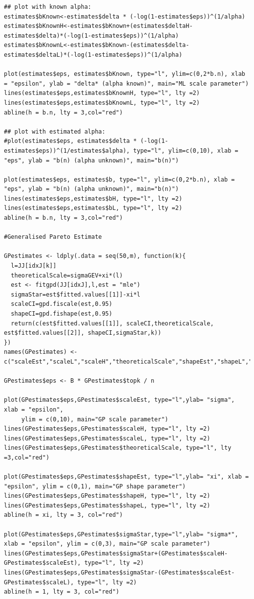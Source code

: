 \documentclass[honours,12pt,twoside, openright]{unswthesis}
\newcommand{\1}{\mathbf 1}
\numberwithin{equation}{section}
\theoremstyle{definition}
\theoremstyle{remark}
\begin{document}
\begin{appendices}
\begin{lstlisting}
## plot with known alpha:
estimates$bKnown<-estimates$delta * (-log(1-estimates$eps))^(1/alpha)
estimates$bKnownH<-estimates$bKnown+(estimates$deltaH-estimates$delta)*(-log(1-estimates$eps))^(1/alpha)
estimates$bKnownL<-estimates$bKnown-(estimates$delta-estimates$deltaL)*(-log(1-estimates$eps))^(1/alpha)

plot(estimates$eps, estimates$bKnown, type="l", ylim=c(0,2*b.n), xlab = "epsilon", ylab = "delta* (alpha known)", main="ML scale parameter")
lines(estimates$eps,estimates$bKnownH, type="l", lty =2)
lines(estimates$eps,estimates$bKnownL, type="l", lty =2)
abline(h = b.n, lty = 3,col="red")

## plot with estimated alpha:
#plot(estimates$eps, estimates$delta * (-log(1-estimates$eps))^(1/estimates$alpha), type="l", ylim=c(0,10), xlab = "eps", ylab = "b(n) (alpha unknown)", main="b(n)")

plot(estimates$eps, estimates$b, type="l", ylim=c(0,2*b.n), xlab = "eps", ylab = "b(n) (alpha unknown)", main="b(n)")
lines(estimates$eps,estimates$bH, type="l", lty =2)
lines(estimates$eps,estimates$bL, type="l", lty =2)
abline(h = b.n, lty = 3,col="red")

#Generalised Pareto Estimate

GPestimates <- ldply(.data = seq(50,m), function(k){
  l=JJ[idxJ[k]]
  theoreticalScale=sigmaGEV+xi*(l)
  est <- fitgpd(JJ[idxJ],l,est = "mle")
  sigmaStar=est$fitted.values[[1]]-xi*l
  scaleCI=gpd.fiscale(est,0.95)
  shapeCI=gpd.fishape(est,0.95)
  return(c(est$fitted.values[[1]], scaleCI,theoreticalScale, est$fitted.values[[2]], shapeCI,sigmaStar,k))
})
names(GPestimates) <- c("scaleEst","scaleL","scaleH","theoreticalScale","shapeEst","shapeL","shapeH","sigmaStar","topk")

GPestimates$eps <- B * GPestimates$topk / n

plot(GPestimates$eps,GPestimates$scaleEst, type="l",ylab= "sigma", xlab = "epsilon", 
     ylim = c(0,10), main="GP scale parameter")
lines(GPestimates$eps,GPestimates$scaleH, type="l", lty =2)
lines(GPestimates$eps,GPestimates$scaleL, type="l", lty =2)
lines(GPestimates$eps,GPestimates$theoreticalScale, type="l", lty =3,col="red")

plot(GPestimates$eps,GPestimates$shapeEst, type="l",ylab= "xi", xlab = "epsilon", ylim = c(0,1), main="GP shape parameter")
lines(GPestimates$eps,GPestimates$shapeH, type="l", lty =2)
lines(GPestimates$eps,GPestimates$shapeL, type="l", lty =2)
abline(h = xi, lty = 3, col="red")

plot(GPestimates$eps,GPestimates$sigmaStar,type="l",ylab= "sigma*", xlab = "epsilon", ylim = c(0,3), main="GP scale parameter")
lines(GPestimates$eps,GPestimates$sigmaStar+(GPestimates$scaleH-GPestimates$scaleEst), type="l", lty =2)
lines(GPestimates$eps,GPestimates$sigmaStar-(GPestimates$scaleEst-GPestimates$scaleL), type="l", lty =2)
abline(h = 1, lty = 3, col="red")
\end{lstlisting}

\end{appendices}
\end{document}
